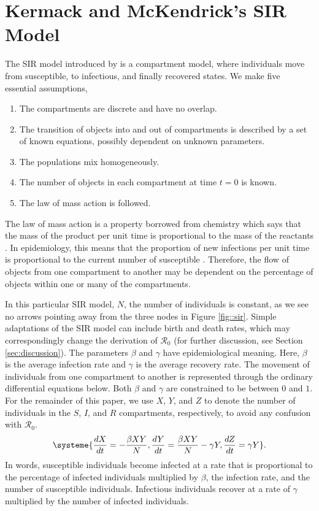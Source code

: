 \documentclass[12pt]{article}
\newcommand{\rr}{\ensuremath{\mathcal{R}_0}}
\begin{document}
\section{Kermack and McKendrick's SIR Model}
\label{sec:sir-intro}

The SIR model introduced by \cite{Kermack700} is a compartment model, where individuals move from susceptible, to infectious, and finally recovered states.  We make five essential assumptions,
\begin{enumerate}
\item The compartments are discrete and have no overlap.
\item The transition of objects into and out of compartments is described by a set of known equations, possibly dependent on unknown parameters.
\item The populations mix homogeneously.
\item The number of objects in each compartment at time $t=0$ is known.
  \item The law of mass action is followed.
  \end{enumerate}  


The law of mass action is a property borrowed from chemistry which says that the mass of the product per unit time is proportional to the mass of the reactants \citep{lotka1920}.  In epidemiology, this means that the proportion of new infections per unit time is proportional to the current  number of susceptible \citep{anderson1992}.  Therefore, the flow of objects from one compartment to another may be dependent on the percentage of objects within one or many of the compartments. 


In this particular  SIR model, $N$, the number of individuals is constant, as we see no arrows pointing away from the three nodes in Figure \ref{fig::sir}. Simple adaptations of the SIR model can include birth and death rates, which may correspondingly change the derivation of $\rr$ (for further discussion, see Section \ref{sec:discussion}). The parameters  $\beta$ and $\gamma$ have epidemiological meaning.  Here, $\beta$ is the average infection rate and $\gamma$ is the average recovery rate.  The movement of individuals from one compartment to another is represented through the ordinary differential equations below.  Both $\beta$ and $\gamma$ are constrained to be between $0$ and $1$.  For the remainder of this paper, we use $X$, $Y$, and $Z$ to denote the number of individuals in the $S$, $I$, and $R$ compartments, respectively, to avoid any confusion with $\rr$.
\begin{align}
\systeme{\frac{dX}{dt} = -\frac{\beta XY}{N}, \frac{dY}{dt} = \frac{\beta XY}{N} - \gamma Y, \frac{dZ}{dt} = \gamma Y}. \label{eq:sir}
\end{align}
In words, susceptible individuals become infected at a rate that is proportional to the percentage of infected individuals multiplied by $\beta$, the infection rate, and the number of susceptible individuals.  Infectious individuals recover at a rate of $\gamma$ multiplied by the number of infected individuals.
\end{document}
